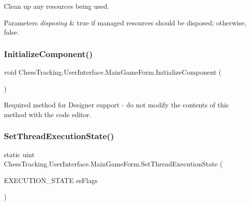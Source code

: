 Clean up any resources being used. 


\begin{DoxyParams}{Parameters}
{\em disposing} & true if managed resources should be disposed; otherwise, false.\\
\hline
\end{DoxyParams}
\mbox{\label{class_chess_tracking_1_1_user_interface_1_1_main_game_form_a27ab4f2f64bddebc0ce3e9c566efccb0}} 
\subsubsection{\texorpdfstring{InitializeComponent()}{InitializeComponent()}}
{\footnotesize\ttfamily void Chess\+Tracking.\+User\+Interface.\+Main\+Game\+Form.\+Initialize\+Component (\begin{DoxyParamCaption}{ }\end{DoxyParamCaption})\hspace{0.3cm}{\ttfamily [private]}}



Required method for Designer support -\/ do not modify the contents of this method with the code editor. 

\mbox{\label{class_chess_tracking_1_1_user_interface_1_1_main_game_form_a2cce03d9e87b9a4afb0d1f9e631bafc2}} 
\subsubsection{\texorpdfstring{SetThreadExecutionState()}{SetThreadExecutionState()}}
{\footnotesize\ttfamily static uint Chess\+Tracking.\+User\+Interface.\+Main\+Game\+Form.\+Set\+Thread\+Execution\+State (\begin{DoxyParamCaption}\item[{E\+X\+E\+C\+U\+T\+I\+O\+N\+\_\+\+S\+T\+A\+TE}]{es\+Flags }\end{DoxyParamCaption})\hspace{0.3cm}{\ttfamily [private]}}



